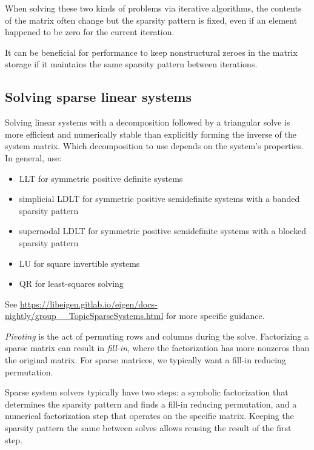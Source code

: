 When solving these two kinds of problems via iterative algorithms, the contents
of the matrix often change but the sparsity pattern is fixed, even if an element
happened to be zero for the current iteration.
\begin{remark}
  It can be beneficial for performance to keep nonstructural zeroes in the
  matrix storage if it maintains the same sparsity pattern between iterations.
\end{remark}

\subsection{Solving sparse linear systems}

Solving linear systems with a decomposition followed by a triangular solve is
more efficient and numerically stable than explicitly forming the inverse of the
system matrix. Which decomposition to use depends on the system's properties.
In general, use:
\begin{itemize}
  \item LLT for symmetric positive definite systems
  \item simplicial LDLT for symmetric positive semidefinite systems with a
    banded sparsity pattern
  \item supernodal LDLT for symmetric positive semidefinite systems with a
    blocked sparsity pattern
  \item LU for square invertible systems
  \item QR for least-squares solving
\end{itemize}

See
\url{https://libeigen.gitlab.io/eigen/docs-nightly/group__TopicSparseSystems.html}
for more specific guidance.

\textit{Pivoting} is the act of permuting rows and columns during the solve.
Factorizing a sparse matrix can result in \textit{fill-in}, where the
factorization has more nonzeros than the original matrix. For sparse matrices,
we typically want a fill-in reducing permutation.

Sparse system solvers typically have two steps: a symbolic factorization that
determines the sparsity pattern and finds a fill-in reducing permutation, and a
numerical factorization step that operates on the specific matrix. Keeping the
sparsity pattern the same between solves allows reusing the result of the first
step.
